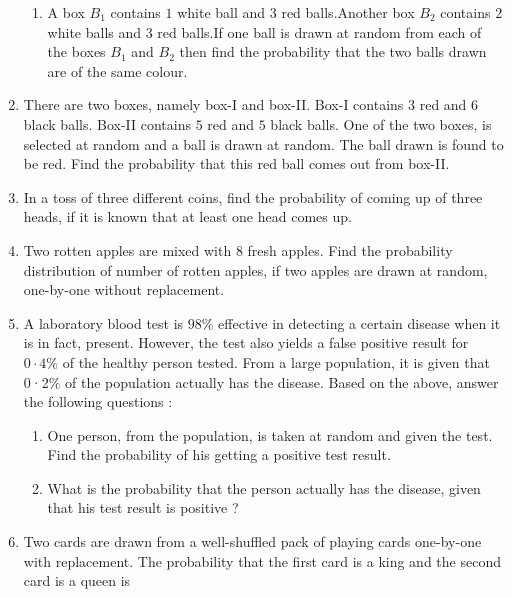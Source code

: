\begin{enumerate}[label=\thesection.\arabic*.,ref=\thesection.\theenumi]
\begin{enumerate}[label=(\alph*)]
 \item  A box $B_{1}$ contains $1$ white ball and $3$ red balls.Another box $B_{2}$ contains $2$ white balls and $3$ red balls.If one ball is drawn at random from each of the boxes $B_{1}$ and $B_{2}$ then find the probability that the two balls drawn are of the same colour.
 
\end{enumerate}

 \item There are two boxes, namely box-I and box-II. Box-I contains $3$ red and $6$ black balls. Box-II contains $5$ red and $5$ black balls. One of the two boxes, is selected at random and a ball is drawn at random. The ball drawn is found to be red. Find the probability that this red ball comes out from box-II.

\item In a toss of three different coins, find the probability of coming up of three heads, if it is known that at least one head comes up.

\item Two rotten apples are mixed with $8$ fresh apples. Find the probability distribution of number of rotten apples, if two apples are drawn at random, one-by-one without replacement.

\item A laboratory blood test is $98\%$ effective in detecting a certain 
disease when it is in fact, present. However, the test also yields 
a false positive result for $0·4\%$ of the healthy person tested. 
From a large population, it is given that 0·2$\%$ of the population 
actually has the disease. 
Based on the above, answer the following questions : 

  \begin{enumerate}[label=(\alph*)]
    
 \item One person, from the population, is taken at random and 
given the test. Find the probability of his getting a 
positive test result.  
 
 \item  What is the probability that the person actually has the 
disease, given that his test result is positive ?

\end{enumerate}

\item Two cards are drawn from a well-shuffled pack of playing 
cards one-by-one with replacement. The probability that the 
first card is a king and the second card is a queen is 


\end{enumerate}
